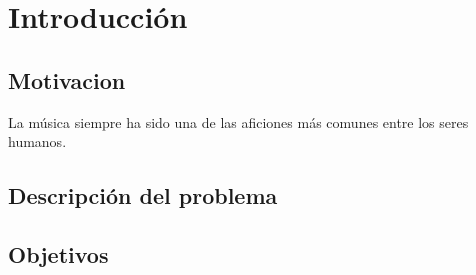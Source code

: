     \chapter{Introducción}
    \section{Motivacion}
    La música siempre ha sido una de las aficiones más comunes entre los seres humanos.
    \section{Descripción del problema}
    
    \section{Objetivos}

